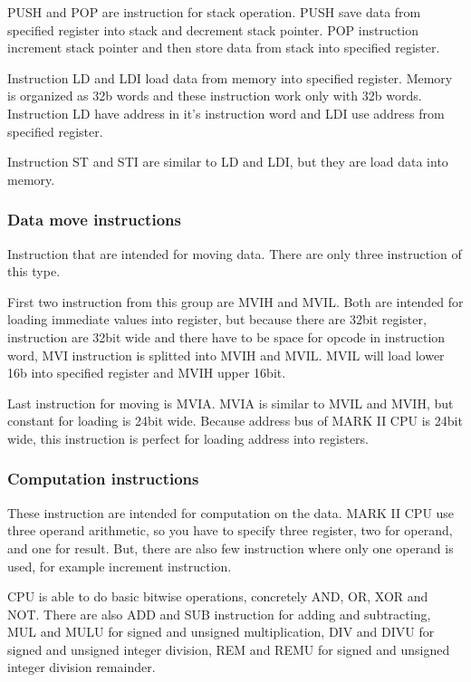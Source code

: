 PUSH and POP are instruction for stack operation. PUSH save data from specified
register into stack and decrement stack pointer. POP instruction increment
stack pointer and then store data from stack into specified register.

Instruction LD and LDI load data from memory into specified register. Memory is
organized as 32b words and these instruction work only with 32b words.
Instruction LD have address in it's instruction word and LDI use address from
specified register.

Instruction ST and STI are similar to LD and LDI, but they are load data into
memory.

\subsubsection{Data move instructions}

Instruction that are intended for moving data. There are only three instruction
of this type.

First two instruction from this group are MVIH and MVIL. Both are intended
for loading immediate values into register, but because there are 32bit
register, instruction are 32bit wide and there have to be space for opcode in
instruction word, MVI instruction is splitted into MVIH and MVIL. MVIL will
load lower 16b into specified register and MVIH upper 16bit.

Last instruction for moving is MVIA. MVIA is similar to MVIL and MVIH, but
constant for loading is 24bit wide. Because address bus of MARK II CPU is 24bit
wide, this instruction is perfect for loading address into registers.

\subsubsection{Computation instructions}

These instruction are intended for computation on the data. MARK II CPU use
three operand arithmetic, so you have to specify three register, two for
operand, and one for result. But, there are also few instruction where only one
operand is used, for example increment instruction.

CPU is able to do basic bitwise operations, concretely AND, OR, XOR and NOT.
There are also ADD and SUB instruction for adding and subtracting, MUL and MULU
for signed and unsigned multiplication, DIV and DIVU for signed and unsigned
integer division, REM and REMU for signed and unsigned integer division remainder.


